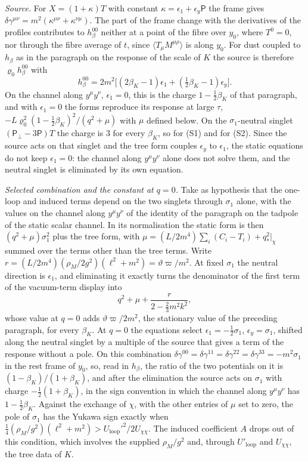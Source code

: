 \emph{Source.} For \(X=(1+\kappa)T\) with constant \(\kappa=\epsilon_1+\epsilon_y\mathsf P\) the frame gives \(\delta\gamma^{\mu\nu}=m^2(\kappa^{\mu\nu}+\kappa^{\nu\mu})\). The part of the frame change with the derivatives of the profiles contributes to \(h_\beta^{00}\) neither at a point of the fibre over \(y_0\), where \(T^0=0\), nor through the fibre average of \(t\), since \(\langle T_\mu M^{\mu\rho}\rangle\) is along \(y_0\). For dust coupled to \(h_\beta\) as in the paragraph on the response of the scale of \(K\) the source is therefore \(\varrho_0h_\beta^{00}\) with
\[
h_\beta^{00}=2m^2\bigl[(2\beta_K-1)\epsilon_1+(\tfrac12\beta_K-1)\epsilon_y\bigr].
\]
On the channel along \(y^\mu y^\nu\), \(\epsilon_1=0\), this is the charge \(1-\tfrac12\beta_K\) of that paragraph, and with \(\epsilon_1=0\) the forms reproduce its response at large \(\tau\), \(-L\varrho_0^2(1-\tfrac12\beta_K)^2/(q^2+\mu)\) with \(\mu\) defined below. On the \(\sigma_1\)-neutral singlet \((\mathsf P_\perp-3\mathsf P)T\) the charge is \(3\) for every \(\beta_K\), so for (S1) and for (S2). Since the source acts on that singlet and the tree form couples \(\epsilon_y\) to \(\epsilon_1\), the static equations do not keep \(\epsilon_1=0\): the channel along \(y^\mu y^\nu\) alone does not solve them, and the neutral singlet is eliminated by its own equation.

\emph{Selected combination and the constant at \(q=0\).} Take as hypothesis that the one-loop and induced terms depend on the two singlets through \(\sigma_1\) alone, with the values on the channel along \(y^\mu y^\nu\) of the identity of the paragraph on the tadpole of the static scalar channel. In its normalisation the static form is then \((q^2+\mu)\sigma_1^2\) plus the tree form, with \(\mu=(L/2m^4)\sum_i(C_i-T_i)+q_*^2|_\chi\) summed over the terms other than the tree terms. Write \(r=(L/2m^4)(\rho_M/2g^2)(\ell^2+m^2)=\vartheta\varpi/m^2\). At fixed \(\sigma_1\) the neutral direction is \(\epsilon_1\), and eliminating it exactly turns the denominator of the first term of the vacuum-term display into
\[
q^2+\mu+\frac{r}{2-\tfrac23m^2k^2},
\]
whose value at \(q=0\) adds \(\vartheta\varpi/2m^2\), the stationary value of the preceding paragraph, for every \(\beta_K\). At \(q=0\) the equations select \(\epsilon_1=-\tfrac12\sigma_1\), \(\epsilon_y=\sigma_1\), shifted along the neutral singlet by a multiple of the source that gives a term of the response without a pole. On this combination \(\delta\gamma^{00}=\delta\gamma^{11}=\delta\gamma^{22}=\delta\gamma^{33}=-m^2\sigma_1\) in the rest frame of \(y_0\), so, read in \(h_\beta\), the ratio of the two potentials on it is \((1-\beta_K)/(1+\beta_K)\), and after the elimination the source acts on \(\sigma_1\) with charge \(-\tfrac12(1+\beta_K)\), in the sign convention in which the channel along \(y^\mu y^\nu\) has \(1-\tfrac12\beta_K\). Against the exchange of \(\chi\), with the other entries of \(\mu\) set to zero, the pole of \(\sigma_1\) has the Yukawa sign exactly when \(\tfrac14(\rho_M/g^2)(\ell^2+m^2)>U_{\mathrm{loop}}'^2/2U_{\chi\chi}\). The induced coefficient \(A\) drops out of this condition, which involves the supplied \(\rho_M/g^2\) and, through \(U'_{\mathrm{loop}}\) and \(U_{\chi\chi}\), the tree data of \(K\).

